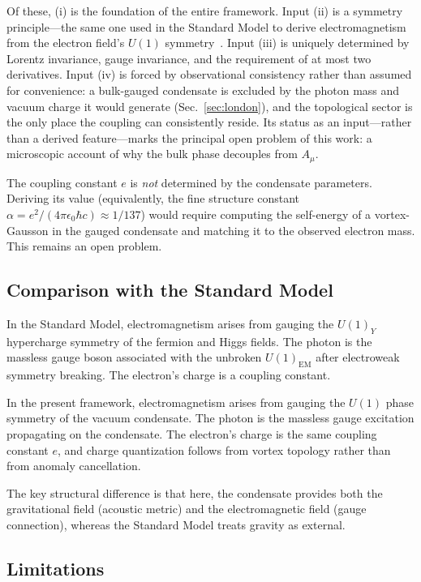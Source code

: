 \documentclass[12pt, a4paper]{article}
\begin{document}
Of these, (i) is the foundation of the entire framework. Input (ii) is a symmetry principle---the same one used in the Standard Model to derive electromagnetism from the electron field's $U(1)$ symmetry~\cite{weinberg_1995}. Input (iii) is uniquely determined by Lorentz invariance, gauge invariance, and the requirement of at most two derivatives. Input (iv) is forced by observational consistency rather than assumed for convenience: a bulk-gauged condensate is excluded by the photon mass and vacuum charge it would generate (Sec.~\ref{sec:london}), and the topological sector is the only place the coupling can consistently reside. Its status as an input---rather than a derived feature---marks the principal open problem of this work: a microscopic account of why the bulk phase decouples from $A_\mu$.

The coupling constant $e$ is \emph{not} determined by the condensate parameters. Deriving its value (equivalently, the fine structure constant $\alpha = e^2/(4\pi\epsilon_0\hbar c) \approx 1/137$) would require computing the self-energy of a vortex-Gausson in the gauged condensate and matching it to the observed electron mass. This remains an open problem.

\subsection{Comparison with the Standard Model}

In the Standard Model, electromagnetism arises from gauging the $U(1)_Y$ hypercharge symmetry of the fermion and Higgs fields. The photon is the massless gauge boson associated with the unbroken $U(1)_{\mathrm{EM}}$ after electroweak symmetry breaking. The electron's charge is a coupling constant.

In the present framework, electromagnetism arises from gauging the $U(1)$ phase symmetry of the vacuum condensate. The photon is the massless gauge excitation propagating on the condensate. The electron's charge is the same coupling constant $e$, and charge quantization follows from vortex topology rather than from anomaly cancellation.

The key structural difference is that here, the condensate provides both the gravitational field (acoustic metric) and the electromagnetic field (gauge connection), whereas the Standard Model treats gravity as external.

\subsection{Limitations}
\end{document}
